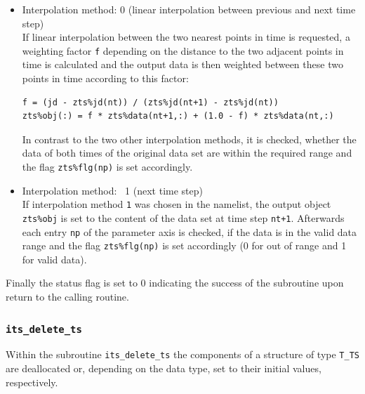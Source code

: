 \documentclass[11pt,twoside]{report}
\begin{document}
\begin{enumerate}
\begin{itemize}
\item Interpolation method: 0 (linear interpolation between previous
 and next time step)\\ 
If linear interpolation between the two nearest points in time is requested,
a weighting factor \verb|f| depending on the distance to the two adjacent points in time
is calculated and the output data is then weighted between these two points
in time according to this factor:
\begin{verbatim}
f = (jd - zts%jd(nt)) / (zts%jd(nt+1) - zts%jd(nt))
zts%obj(:) = f * zts%data(nt+1,:) + (1.0 - f) * zts%data(nt,:)
\end{verbatim}
In contrast to the two other interpolation methods, it is checked, 
whether the data of both times of the original data set are within the
required range and the flag \verb|zts%flg(np)| is set accordingly.

\item Interpolation method: ~1 (next time step)\\
If interpolation method \verb|1| was chosen in the namelist, the output object
 \verb|zts%obj| is set to the content of the data set at time step \verb|nt+1|.
Afterwards each entry \verb|np| of the parameter axis is checked, if the data
 is in the valid data range and the flag \verb|zts%flg(np)| is set
accordingly (0 for out of range and 1 for valid data).
\end{itemize}
\end{enumerate}
Finally the status flag is set to 0 indicating the success of the subroutine
upon return to the calling routine.

\subsubsection{\color{blue} \tt\bf its\_delete\_ts\label{ITSdelete}}
Within the subroutine \verb|its_delete_ts| the components of a structure
of type \verb|T_TS| are deallocated or, depending on the data type,
 set to their initial values, respectively.

\end{document}
